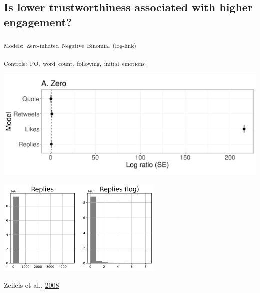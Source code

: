 \documentclass[
  letterpaper,
  DIV=11,
  numbers=noendperiod]{scrartcl}
\begin{document}
\hypertarget{is-lower-trustworthiness-associated-with-higher-engagement-1}{%
\subsection{Is lower trustworthiness associated with higher
engagement?}\label{is-lower-trustworthiness-associated-with-higher-engagement-1}}

\textsubscript{Models:~Zero-inflated~Negative~Binomial~(log-link)}

\textsubscript{Controls:~PO,~word~count,~following,~initial~emotions}

\includegraphics[width=6.25in,height=\textheight]{images/models_zero_estimates-se.png}

\includegraphics[width=3.125in,height=\textheight]{images/reply_distributions.png}

Zeileis et al., \href{http://www.jstatsoft.org/v27/i08/}{2008}
\end{document}
